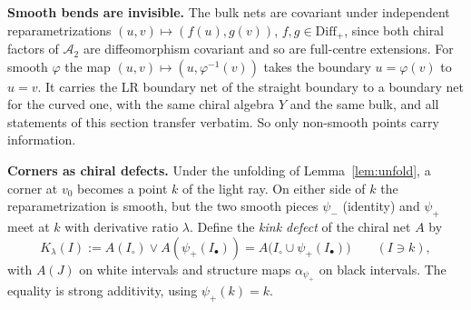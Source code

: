\documentclass[11pt]{article}
\theoremstyle{definition}
\theoremstyle{remark}
\newcommand{\cA}{\mathcal A}
\begin{document}
\textbf{Smooth bends are invisible.} The bulk nets are covariant under independent reparametrizations $(u,v)\mapsto(f(u),g(v))$, $f,g\in\mathrm{Diff}_+$, since both chiral factors of $\cA_2$ are diffeomorphism covariant and so are full-centre extensions. For smooth $\varphi$ the map $(u,v)\mapsto(u,\varphi^{-1}(v))$ takes the boundary $u=\varphi(v)$ to $u=v$. It carries the LR boundary net of the straight boundary to a boundary net for the curved one, with the same chiral algebra $Y$ and the same bulk, and all statements of this section transfer verbatim. So only non-smooth points carry information.

\textbf{Corners as chiral defects.} Under the unfolding of Lemma~\ref{lem:unfold}, a corner at $v_0$ becomes a point $k$ of the light ray. On either side of $k$ the reparametrization is smooth, but the two smooth pieces $\psi_-$ (identity) and $\psi_+$ meet at $k$ with derivative ratio $\lambda$. Define the \emph{kink defect} of the chiral net $A$ by
\[
K_\lambda(I):=A(I_\circ)\vee A(\psi_+(I_\bullet))=A\big(I_\circ\cup\psi_+(I_\bullet)\big)\qquad(I\ni k),
\]
with $A(J)$ on white intervals and structure maps $\alpha_{\psi_+}$ on black intervals. The equality is strong additivity, using $\psi_+(k)=k$.
\end{document}
